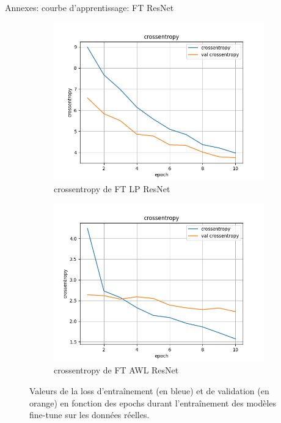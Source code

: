 \documentclass[11pt]{beamer}
\begin{document}
\begin{frame}{Annexes: courbe d'apprentissage: FT ResNet}
    \begin{figure}[ht]
        \centering
        \begin{subfigure}{0.45\textwidth}
            \centering
            \includegraphics[width=\linewidth]{../logs/retrain_resnet_img256_0/crossentropy.png}
            \caption{crossentropy de FT LP ResNet}
        \end{subfigure}
        \begin{subfigure}{0.45\textwidth}
            \centering
            \includegraphics[width=\linewidth]{../logs/retrain_resnet_allw_img256_2/crossentropy.png}
            \caption{crossentropy de FT AWL ResNet}
        \end{subfigure}
        \caption{Valeurs de la loss d'entraînement (en bleue) et de validation (en orange) en fonction des epochs durant l'entraînement des modèles fine-tune sur les données réelles.}
        \label{fig: finetune}
    \end{figure}
\end{frame}

\end{document}
